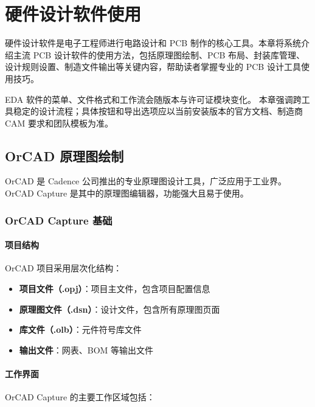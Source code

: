 \chapter{硬件设计软件使用}

硬件设计软件是电子工程师进行电路设计和 PCB 制作的核心工具。本章将系统介绍主流 PCB 设计软件的使用方法，包括原理图绘制、PCB 布局、封装库管理、设计规则设置、制造文件输出等关键内容，帮助读者掌握专业的 PCB 设计工具使用技巧。

EDA 软件的菜单、文件格式和工作流会随版本与许可证模块变化。
本章强调跨工具稳定的设计流程；具体按钮和导出选项应以当前安装版本的官方文档、制造商 CAM 要求和团队模板为准。

\section{OrCAD 原理图绘制}

OrCAD 是 Cadence 公司推出的专业原理图设计工具，广泛应用于工业界。OrCAD Capture 是其中的原理图编辑器，功能强大且易于使用。

\subsection{OrCAD Capture 基础}

\subsubsection{项目结构}

OrCAD 项目采用层次化结构：

\begin{itemize}
  \item \textbf{项目文件（.opj）}：项目主文件，包含项目配置信息
  \item \textbf{原理图文件（.dsn）}：设计文件，包含所有原理图页面
  \item \textbf{库文件（.olb）}：元件符号库文件
  \item \textbf{输出文件}：网表、BOM 等输出文件
\end{itemize}

\subsubsection{工作界面}

OrCAD Capture 的主要工作区域包括：

